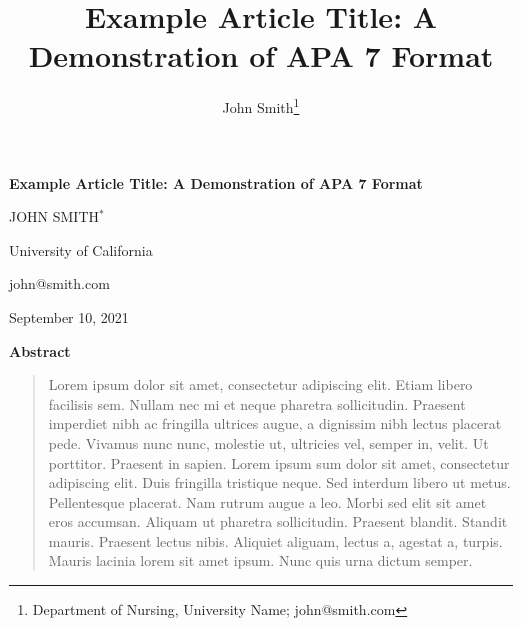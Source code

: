 \documentclass[12pt]{article}
\title{\textbf{Example Article Title: A Demonstration of APA 7 Format}}
\author{John Smith\thanks{Department of Nursing, University Name; john@smith.com}}
\date{}
\begin{document}
\begin{center}
\vspace*{0.5in}
{\Large\textbf{Example Article Title: A Demonstration of APA 7 Format}}

\vspace{0.3in}
{\normalsize JOHN SMITH$^*$}

\vspace{0.15in}
{\normalsize University of California}

{\normalsize john@smith.com}

\vspace{0.15in}
{\normalsize September 10, 2021}

\vspace{0.3in}
{\textbf{Abstract}}
\end{center}

\begin{quotation}
\noindent
Lorem ipsum dolor sit amet, consectetur adipiscing elit. Etiam libero facilisis sem. Nullam nec mi et neque pharetra sollicitudin. Praesent imperdiet nibh ac fringilla ultrices augue, a dignissim nibh lectus placerat pede. Vivamus nunc nunc, molestie ut, ultricies vel, semper in, velit. Ut porttitor. Praesent in sapien. Lorem ipsum sum dolor sit amet, consectetur adipiscing elit. Duis fringilla tristique neque. Sed interdum libero ut metus. Pellentesque placerat. Nam rutrum augue a leo. Morbi sed elit sit amet eros accumsan. Aliquam ut pharetra sollicitudin. Praesent blandit. Standit mauris. Praesent lectus nibis. Aliquiet aliguam, lectus a, agestat a, turpis. Mauris lacinia lorem sit amet ipsum. Nunc quis urna dictum semper.
\end{quotation}

\vspace{0.2in}
\end{document}
